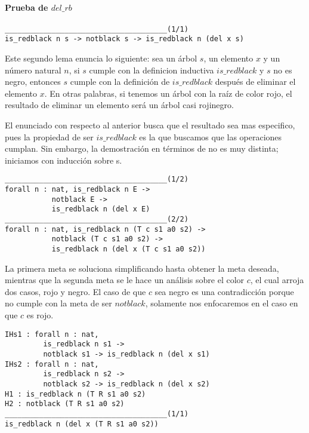 \paragraph{Prueba de \hyperref[lema_6]{$del\_rb$}}

\begin{verbatim}
______________________________________(1/1)
is_redblack n s -> notblack s -> is_redblack n (del x s)
\end{verbatim}

Este segundo lema enuncia lo siguiente: sea un \'arbol $s$, un elemento $x$ y un n\'umero natural
$n$, si $s$ cumple con la definicion inductiva \hyperref[inductive_isRedB]{$is\_redblack$} y $s$ no 
es negro, entonces $s$ cumple con la definición de \hyperref[inductive_isRedB]{$is\_redblack$} 
después de eliminar el elemento $x$. En otras palabras, si tenemos un \'arbol con la raíz de color 
rojo, el resultado de eliminar un elemento ser\'a un \'arbol casi rojinegro.

El enunciado con respecto al anterior busca que el resultado sea mas especifico, pues la propiedad
de ser \hyperref[inductive_isRedB]{$is\_redblack$} es la que buscamos que las operaciones cumplan. 
Sin embargo, la demostraci\'on en términos de {\coq} no es muy distinta; iniciamos con inducci\'on 
sobre s.

\begin{verbatim}
______________________________________(1/2)
forall n : nat, is_redblack n E ->
           notblack E ->
           is_redblack n (del x E)
______________________________________(2/2)
forall n : nat, is_redblack n (T c s1 a0 s2) ->
           notblack (T c s1 a0 s2) ->
           is_redblack n (del x (T c s1 a0 s2))
\end{verbatim}

La primera meta se soluciona simplificando hasta obtener la meta deseada, mientras que la segunda
meta se le hace un análisis sobre el color $c$, el cual arroja dos casos, rojo y negro. El caso de
que $c$ sea negro es una contradicci\'on porque no cumple con la meta de ser $notblack$, solamente
nos enfocaremos en el caso en que $c$ es rojo.

\begin{verbatim}
IHs1 : forall n : nat,
         is_redblack n s1 ->
         notblack s1 -> is_redblack n (del x s1)
IHs2 : forall n : nat,
         is_redblack n s2 ->
         notblack s2 -> is_redblack n (del x s2)
H1 : is_redblack n (T R s1 a0 s2)
H2 : notblack (T R s1 a0 s2)
______________________________________(1/1)
is_redblack n (del x (T R s1 a0 s2))
\end{verbatim}

